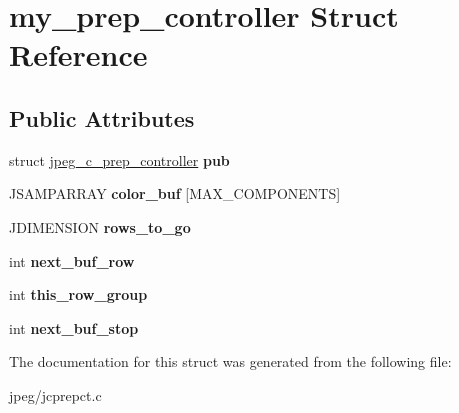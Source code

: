 \hypertarget{structmy__prep__controller}{}\section{my\+\_\+prep\+\_\+controller Struct Reference}
\label{structmy__prep__controller}
\subsection*{Public Attributes}
\begin{DoxyCompactItemize}
\item 
struct \hyperlink{structjpeg__c__prep__controller}{jpeg\+\_\+c\+\_\+prep\+\_\+controller} {\bfseries pub}\hypertarget{structmy__prep__controller_a3fb45ffb334d46e9786e32eefded333a}{}\label{structmy__prep__controller_a3fb45ffb334d46e9786e32eefded333a}

\item 
J\+S\+A\+M\+P\+A\+R\+R\+AY {\bfseries color\+\_\+buf} \mbox{[}M\+A\+X\+\_\+\+C\+O\+M\+P\+O\+N\+E\+N\+TS\mbox{]}\hypertarget{structmy__prep__controller_ac1479671472328faf5d381a202658783}{}\label{structmy__prep__controller_ac1479671472328faf5d381a202658783}

\item 
J\+D\+I\+M\+E\+N\+S\+I\+ON {\bfseries rows\+\_\+to\+\_\+go}\hypertarget{structmy__prep__controller_a824b65d503dae6698d6a482d49a8043c}{}\label{structmy__prep__controller_a824b65d503dae6698d6a482d49a8043c}

\item 
int {\bfseries next\+\_\+buf\+\_\+row}\hypertarget{structmy__prep__controller_af93cf69d2ea14660586c93a1b08774a2}{}\label{structmy__prep__controller_af93cf69d2ea14660586c93a1b08774a2}

\item 
int {\bfseries this\+\_\+row\+\_\+group}\hypertarget{structmy__prep__controller_a2fd911bc5ad6043822b493554513b8bb}{}\label{structmy__prep__controller_a2fd911bc5ad6043822b493554513b8bb}

\item 
int {\bfseries next\+\_\+buf\+\_\+stop}\hypertarget{structmy__prep__controller_a1332bc531a2d55aaef228a3a9a3fd62f}{}\label{structmy__prep__controller_a1332bc531a2d55aaef228a3a9a3fd62f}

\end{DoxyCompactItemize}


The documentation for this struct was generated from the following file\+:\begin{DoxyCompactItemize}
\item 
jpeg/jcprepct.\+c\end{DoxyCompactItemize}

